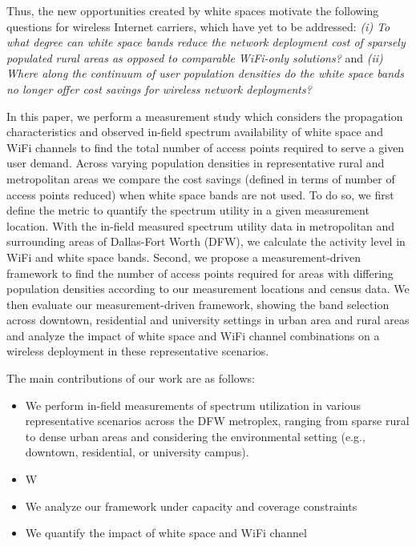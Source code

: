 Thus, the new opportunities created by white spaces motivate the following 
questions for wireless Internet carriers, which have yet to be addressed: 
{\it (i) To what degree can white space bands reduce the network deployment cost of
sparsely populated rural areas as opposed to comparable WiFi-only solutions?} and 
{\it (ii) Where along the continuum of user population densities do the white
space bands no longer offer cost savings for wireless network deployments?}

In this paper, we perform a measurement study which considers the propagation 
characteristics and observed in-field spectrum availability of white space
and WiFi channels to find the total number of access points required to serve a 
given user demand. Across varying population densities in representative 
rural and metropolitan areas we compare the cost savings (defined in terms of
number of access points reduced) when white space bands are not used.
To do so, we first define the metric to quantify the spectrum utility in a
given measurement location. With the in-field measured spectrum utility data 
in metropolitan and surrounding areas of Dallas-Fort Worth (DFW), we 
calculate the activity level in WiFi and white space bands. Second, we 
propose a measurement-driven framework to find the number of access points required 
for areas with differing population densities according to our measurement locations
and census data. We then evaluate our measurement-driven framework, showing
the band selection across downtown, residential and university settings in
urban area and rural areas and analyze the impact of white space and WiFi
channel combinations on a wireless deployment in these representative scenarios.

The main contributions of our work are as follows:
\begin{itemize}
\item We perform in-field measurements of spectrum utilization in various representative
scenarios across the DFW metroplex, ranging from sparse rural to dense urban areas and 
considering the environmental setting (e.g., downtown, residential, or university campus).
\item W
\item We analyze our framework under capacity and coverage constraints 
\item We quantify the impact of white space and WiFi channel
\end{itemize}


